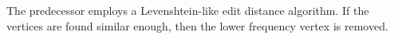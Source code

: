 \documentclass[conference]{IEEEtran}
\begin{document}
The predecessor employs a Levenshtein-like edit distance algorithm. If the vertices are found similar enough, then the lower frequency vertex is removed. 

 


\end{document}
